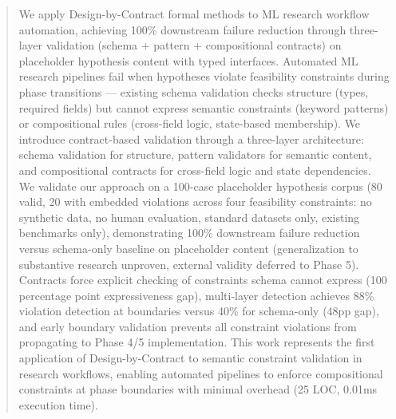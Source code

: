 \begin{abstract}
We apply Design-by-Contract formal methods to ML research workflow automation, achieving 100\% downstream failure reduction through three-layer validation (schema + pattern + compositional contracts) on placeholder hypothesis content with typed interfaces. Automated ML research pipelines fail when hypotheses violate feasibility constraints during phase transitions --- existing schema validation checks structure (types, required fields) but cannot express semantic constraints (keyword patterns) or compositional rules (cross-field logic, state-based membership). We introduce contract-based validation through a three-layer architecture: schema validation for structure, pattern validators for semantic content, and compositional contracts for cross-field logic and state dependencies. We validate our approach on a 100-case placeholder hypothesis corpus (80 valid, 20 with embedded violations across four feasibility constraints: no synthetic data, no human evaluation, standard datasets only, existing benchmarks only), demonstrating 100\% downstream failure reduction versus schema-only baseline on placeholder content (generalization to substantive research unproven, external validity deferred to Phase 5). Contracts force explicit checking of constraints schema cannot express (100 percentage point expressiveness gap), multi-layer detection achieves 88\% violation detection at boundaries versus 40\% for schema-only (48pp gap), and early boundary validation prevents all constraint violations from propagating to Phase 4/5 implementation. This work represents the first application of Design-by-Contract to semantic constraint validation in research workflows, enabling automated pipelines to enforce compositional constraints at phase boundaries with minimal overhead (25 LOC, 0.01ms execution time).
\end{abstract}
